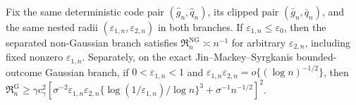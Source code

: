 Fix the same deterministic code pair \((\widehat g_n,\widehat q_n)\), its clipped pair \((\bar g_n,\bar q_n)\), and the same nested radii \((\varepsilon_{1,n},\varepsilon_{2,n})\) in both branches. If \(\varepsilon_{1,n}\le\varepsilon_0\), then the separated non-Gaussian branch satisfies \(\mathfrak R_n^{\mathrm{NG}}\asymp n^{-1}\) for arbitrary \(\varepsilon_{2,n}\), including fixed nonzero \(\varepsilon_{1,n}\). Separately, on the exact Jin--Mackey--Syrgkanis bounded-outcome Gaussian branch, if \(0<\varepsilon_{1,n}<1\) and \(\varepsilon_{1,n}\varepsilon_{2,n}=o\{(\log n)^{-1/2}\}\), then \(\mathfrak R_n^{\mathrm G}\ge\gamma c_{\gamma}^2[\sigma^{-2}\varepsilon_{1,n}\varepsilon_{2,n}\{\log(1/\varepsilon_{1,n})/\log n\}^3+\sigma^{-1}n^{-1/2}]^2\).